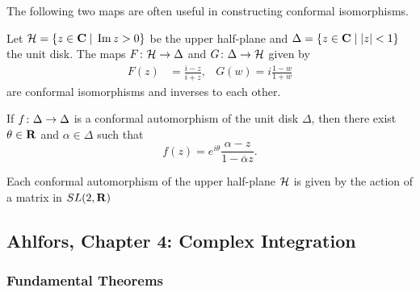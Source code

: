The following two maps are often useful in constructing conformal isomorphisms.

\begin{proposition}
  Let $\mathcal{H} = \{ z \in \mathbf{C} \;|\; \mathop{\textnormal{Im}}\nolimits z > 0 \}$ be the upper half-plane and $\Delta = \{ z \in \mathbf{C} \;|\; |z| < 1 \}$ the unit disk. The maps $F \colon \mathcal{H} \rightarrow \Delta$ and $G \colon \Delta \rightarrow \mathcal{H}$ given by
  \begin{align*}
    F(z) &= \frac{i-z}{i+z}, &
    G(w) = i \frac{1-w}{1+w}
  \end{align*}
  are conformal isomorphisms and inverses to each other.
\end{proposition}

\begin{theorem}
  If $f \colon \Delta \rightarrow \Delta$ is a conformal automorphism of the unit disk $\Delta$, then there exist $\theta \in \mathbf{R}$ and $\alpha \in \Delta$ such that
  \[
  f(z) = e^{i\theta} \frac{\alpha-z}{1-\overline{\alpha}z}.
  \]
\end{theorem}

\begin{corollary}
  Each conformal automorphism of the upper half-plane $\mathcal{H}$ is given by the action of a matrix in $SL(2,\mathbf{R})$
\end{corollary}

\subsection{Ahlfors, Chapter 4: Complex Integration}

\subsubsection{Fundamental Theorems}


